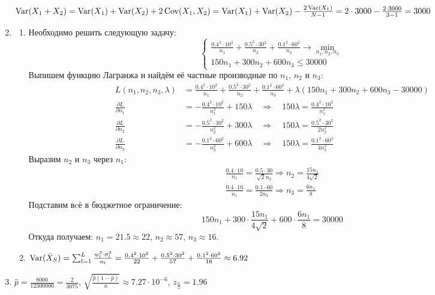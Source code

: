 \begin{enumerate}
$\operatorname{Var}(X_1+X_2) = \operatorname{Var}(X_1) + \operatorname{Var}(X_2) + 2\operatorname{Cov}(X_1, X_2) = \operatorname{Var}(X_1) + \operatorname{Var}(X_2) - \frac{2\operatorname{Var}(X_1)}{N-1} = 2 \cdot 3000 - \frac{2\cdot3000}{3-1} = 3000$
\item
\begin{enumerate}
\item Необходимо решить следующую задачу:
\[
\begin{cases}
\frac{0.4^2 \cdot 10^2}{n_1} + \frac{0.5^2 \cdot 30^2}{n_2} + \frac{0.1^2 \cdot 60^2}{n_3} \to \min_{n_1, n_2, n_3} \\
150 n_1 + 300 n_2 + 600 n_3 \leq 30000
\end{cases}
\]
Выпишем функцию Лагранжа и найдём её частные производные по $n_1$, $n_2$ и $n_3$:
\begin{align*}
L(n_1, n_2, n_3, \lambda) &= \frac{0.4^2 \cdot 10^2}{n_1} + \frac{0.5^2 \cdot 30^2}{n_2} + \frac{0.1^2 \cdot 60^2}{n_3} + \lambda (150 n_1 + 300 n_2 + 600 n_3 - 30000) \\
\frac{\partial L}{\partial n_1} &= -\frac{0.4^2 \cdot 10^2}{n_1^2} + 150 \lambda \quad \Rightarrow \quad 150 \lambda = \frac{0.4^2 \cdot 10^2}{n_1^2} \\
\frac{\partial L}{\partial n_2} &= -\frac{0.5^2 \cdot 30^2}{n_2^2} + 300 \lambda \quad \Rightarrow \quad 150 \lambda = \frac{0.5^2 \cdot 30^2}{2n_2^2} \\
\frac{\partial L}{\partial n_2} &= -\frac{0.1^2 \cdot 60^2}{n_3^2} + 600 \lambda \quad \Rightarrow \quad 150 \lambda = \frac{0.1^2 \cdot 60^2}{4n_3^2}
\end{align*}
Выразим $n_2$ и $n_3$ через $n_1$:
\begin{align*}
\frac{0.4 \cdot 10}{n_1} = \frac{0.5 \cdot 30}{\sqrt{2}n_2} \Rightarrow n_2 = \frac{15n_1}{4\sqrt{2}} \\
\frac{0.4 \cdot 10}{n_1} = \frac{0.1 \cdot 60}{2n_3} \Rightarrow n_3 = \frac{6n_1}{8}
\end{align*}
Подставим вcё в бюджетное ограничение:
\[
150 n_1 + 300 \cdot \frac{15n_1}{4\sqrt{2}} + 600 \cdot \frac{6n_1}{8} = 30000
\]
Откуда получаем: $n_1 = 21.5 \approx 22$, $n_2 \approx 57$, $n_3 \approx 16$.
\item
$\operatorname{Var}(\bar{X}_S) = \sum_{l=1}^L \frac{w_l^2 \cdot \sigma_l^2}{n_l}
= \frac{0.4^2 \cdot 10^2}{22} + \frac{0.5^2 \cdot 30^2}{57} + \frac{0.1^2 \cdot 60^2}{16}
\approx 6.92$
\end{enumerate}
\item $\hat{p} = \frac{8000}{12300000} = \frac{2}{3075}$,
$\sqrt{\frac{\hat{p}(1-\hat{p})}{n}} \approx 7.27 \cdot 10^{-6}$, $z_{\frac{\alpha}{2}} = 1.96$


\end{enumerate}
